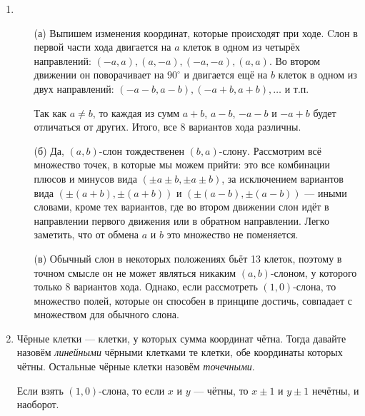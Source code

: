 
\begin{enumerate}

\item \begin{itemize}
\item[(а)] Выпишем изменения координат, которые происходят при ходе. 
Cлон в первой части хода двигается на $a$ клеток 
в одном из четырёх направлений: $(-a,a), (a,-a), (-a,-a), (a,a)$. Во втором 
движении он поворачивает на $90^\circ$ и двигается ещё на $b$ клеток в одном
из двух направлений: $(-a-b,a-b), (-a+b,a+b), \ldots$ и т.п.

Так как $a\ne b$, то каждая из сумм $a+b$, $a-b$, $-a-b$ и $-a+b$ будет отличаться
от других. Итого, все 8 вариантов хода различны.

\item[(б)] Да, $(a,b)$-слон тождественен $(b,a)$-слону. Рассмотрим всё множество точек,
в которые мы можем прийти: это все комбинации плюсов и минусов вида
$(\pm a \pm b, \pm a \pm b)$, за исключением
вариантов вида $(\pm (a+b), \pm (a+b))$ и $(\pm (a-b), \pm (a-b))$
--- иными словами, кроме тех вариантов, где во втором движении слон идёт в направлении
первого движения или в обратном направлении. Легко заметить, что от обмена
$a$ и $b$ это множество не поменяется.

\item[(в)] Обычный слон в некоторых положениях бьёт 13 клеток, поэтому в точном смысле он
не может являться никаким $(a,b)$-слоном, у которого только 8 вариантов хода. Однако,
если рассмотреть $(1,0)$-слона, то множество полей, которые он способен в принципе достичь,
совпадает с множеством для обычного слона.
\end{itemize}

\item Чёрные клетки --- клетки, у которых сумма координат чётна. Тогда давайте
назовём \emph{линейными} чёрными клетками те клетки, обе координаты которых чётны. 
Остальные чёрные клетки назовём \emph{точечными}. 

Если взять $(1,0)$-слона, то если $x$ и $y$ --- чётны, то $x \pm 1$ и $y \pm 1$ нечётны,
и наоборот.

\begin{center}\end{center}


\end{enumerate}
